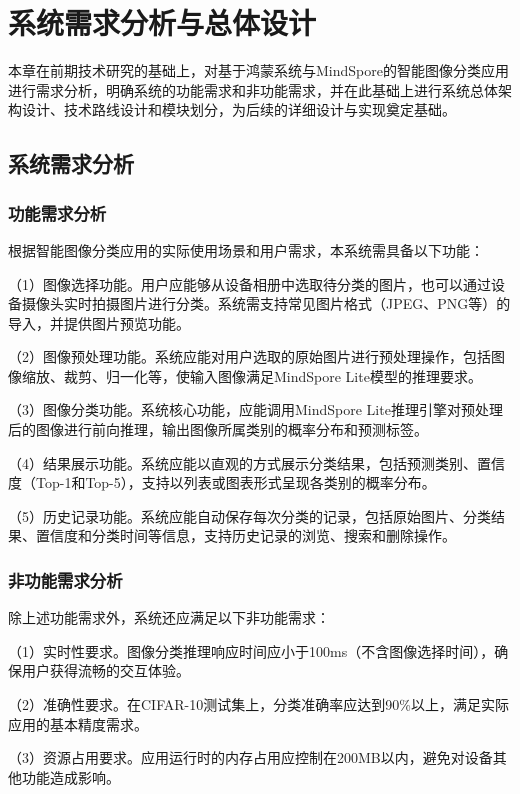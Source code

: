 \chapter{系统需求分析与总体设计}

本章在前期技术研究的基础上，对基于鸿蒙系统与MindSpore的智能图像分类应用进行需求分析，明确系统的功能需求和非功能需求，并在此基础上进行系统总体架构设计、技术路线设计和模块划分，为后续的详细设计与实现奠定基础。

\section{系统需求分析}

\subsection{功能需求分析}

根据智能图像分类应用的实际使用场景和用户需求，本系统需具备以下功能：

（1）图像选择功能。用户应能够从设备相册中选取待分类的图片，也可以通过设备摄像头实时拍摄图片进行分类。系统需支持常见图片格式（JPEG、PNG等）的导入，并提供图片预览功能。

（2）图像预处理功能。系统应能对用户选取的原始图片进行预处理操作，包括图像缩放、裁剪、归一化等，使输入图像满足MindSpore Lite模型的推理要求。

（3）图像分类功能。系统核心功能，应能调用MindSpore Lite推理引擎对预处理后的图像进行前向推理，输出图像所属类别的概率分布和预测标签。

（4）结果展示功能。系统应能以直观的方式展示分类结果，包括预测类别、置信度（Top-1和Top-5），支持以列表或图表形式呈现各类别的概率分布。

（5）历史记录功能。系统应能自动保存每次分类的记录，包括原始图片、分类结果、置信度和分类时间等信息，支持历史记录的浏览、搜索和删除操作。

\subsection{非功能需求分析}

除上述功能需求外，系统还应满足以下非功能需求：

（1）实时性要求。图像分类推理响应时间应小于100ms（不含图像选择时间），确保用户获得流畅的交互体验。

（2）准确性要求。在CIFAR-10测试集上，分类准确率应达到90\%以上，满足实际应用的基本精度需求。

（3）资源占用要求。应用运行时的内存占用应控制在200MB以内，避免对设备其他功能造成影响。

